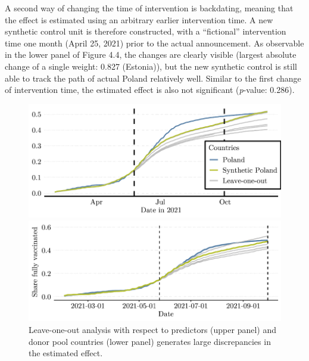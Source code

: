 \documentclass{scrbook}
\begin{document}
A second way of changing the time of intervention is backdating, meaning
that the effect is estimated using an arbitrary earlier intervention
time. A new synthetic control unit is therefore constructed, with a
``fictional'' intervention time one month (April 25, 2021) prior to the
actual announcement. As observable in the lower panel of Figure 4.4, the
changes are clearly visible (largest absolute change of a single weight:
0.827 (Estonia)), but the new synthetic control is still able to track
the path of actual Poland relatively well. Similar to the first change
of intervention time, the estimated effect is also not significant
(\textit{p}-value: 0.286).

\begin{figure}[h]
\caption[Robustness check: Leave-one-out analysis]{Leave-one-out analysis with respect to predictors (upper panel) and donor pool countries (lower panel) generates large discrepancies in the estimated effect.}

\begin{center}\includegraphics{bachelor_thesis_files/figure-latex/unnamed-chunk-6-1} \end{center}



\begin{center}\includegraphics{bachelor_thesis_files/figure-latex/unnamed-chunk-6-2} \end{center}
\end{figure}
\end{document}
